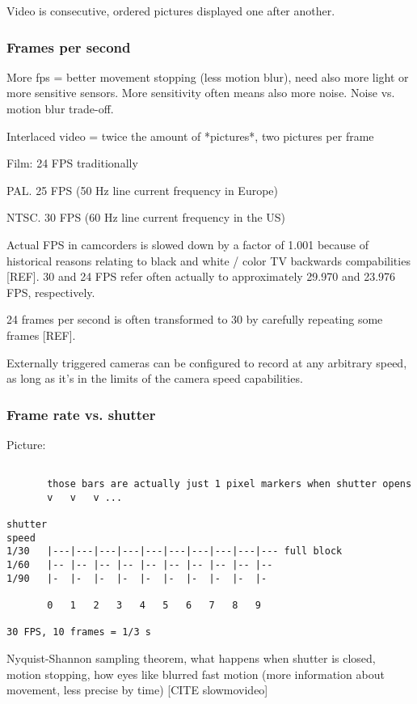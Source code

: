 Video is consecutive, ordered pictures displayed one after another.

\subsubsection{Frames per second}

More fps = better movement stopping (less motion blur), need also more light or more sensitive sensors. More sensitivity often means also more noise. Noise vs. motion blur trade-off.

Interlaced video = twice the amount of *pictures*, two pictures per frame

Film: 24 FPS traditionally

PAL. 25 FPS (50 Hz line current frequency in Europe)

NTSC. 30 FPS (60 Hz line current frequency in the US)

Actual FPS in camcorders is slowed down by a factor of 1.001 because of historical reasons relating to black and white / color TV backwards compabilities [REF].
30 and 24 FPS refer often actually to approximately 29.970 and 23.976 FPS, respectively.

24 frames per second is often transformed to 30 by carefully repeating some frames [REF].

Externally triggered cameras can be configured to record at any arbitrary speed, as long as it's in the limits of the camera speed capabilities.

\subsubsection{Frame rate vs. shutter}

Picture:

\begin{verbatim}

       those bars are actually just 1 pixel markers when shutter opens
       v   v   v ...

shutter
speed
1/30   |---|---|---|---|---|---|---|---|---|--- full block
1/60   |-- |-- |-- |-- |-- |-- |-- |-- |-- |--
1/90   |-  |-  |-  |-  |-  |-  |-  |-  |-  |-

       0   1   2   3   4   5   6   7   8   9

30 FPS, 10 frames = 1/3 s
\end{verbatim}

Nyquist-Shannon sampling theorem, what happens when shutter is closed, motion stopping, how eyes like blurred fast motion (more information about movement, less precise by time) [CITE slowmovideo]

